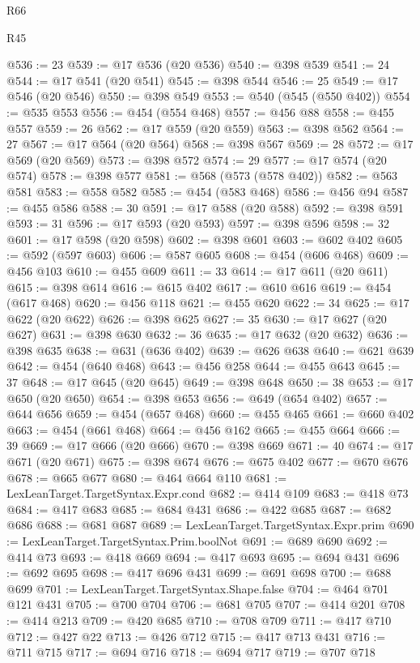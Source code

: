 \begin{lexlean}{R66}
\begin{lexlean}{R45}
\begin{coremodule}
{{{{{{{{{{{{{{{{{{{{{{{{{{{{{{{{{{{{{{{{{{{{{{{{{{{{{{{{{{{{{{{{{{{{{{{{{{{{{{{{{{{{{{{{{{{@536 := 23
@539 := @17 @536 (@20 @536)
@540 := @398 @539
@541 := 24
@544 := @17 @541 (@20 @541)
@545 := @398 @544
@546 := 25
@549 := @17 @546 (@20 @546)
@550 := @398 @549
@553 := @540 (@545 (@550 @402))
@554 := @535 @553
@556 := @454 (@554 @468)
@557 := @456 @88
@558 := @455 @557
@559 := 26
@562 := @17 @559 (@20 @559)
@563 := @398 @562
@564 := 27
@567 := @17 @564 (@20 @564)
@568 := @398 @567
@569 := 28
@572 := @17 @569 (@20 @569)
@573 := @398 @572
@574 := 29
@577 := @17 @574 (@20 @574)
@578 := @398 @577
@581 := @568 (@573 (@578 @402))
@582 := @563 @581
@583 := @558 @582
@585 := @454 (@583 @468)
@586 := @456 @94
@587 := @455 @586
@588 := 30
@591 := @17 @588 (@20 @588)
@592 := @398 @591
@593 := 31
@596 := @17 @593 (@20 @593)
@597 := @398 @596
@598 := 32
@601 := @17 @598 (@20 @598)
@602 := @398 @601
@603 := @602 @402
@605 := @592 (@597 @603)
@606 := @587 @605
@608 := @454 (@606 @468)
@609 := @456 @103
@610 := @455 @609
@611 := 33
@614 := @17 @611 (@20 @611)
@615 := @398 @614
@616 := @615 @402
@617 := @610 @616
@619 := @454 (@617 @468)
@620 := @456 @118
@621 := @455 @620
@622 := 34
@625 := @17 @622 (@20 @622)
@626 := @398 @625
@627 := 35
@630 := @17 @627 (@20 @627)
@631 := @398 @630
@632 := 36
@635 := @17 @632 (@20 @632)
@636 := @398 @635
@638 := @631 (@636 @402)
@639 := @626 @638
@640 := @621 @639
@642 := @454 (@640 @468)
@643 := @456 @258
@644 := @455 @643
@645 := 37
@648 := @17 @645 (@20 @645)
@649 := @398 @648
@650 := 38
@653 := @17 @650 (@20 @650)
@654 := @398 @653
@656 := @649 (@654 @402)
@657 := @644 @656
@659 := @454 (@657 @468)
@660 := @455 @465
@661 := @660 @402
@663 := @454 (@661 @468)
@664 := @456 @162
@665 := @455 @664
@666 := 39
@669 := @17 @666 (@20 @666)
@670 := @398 @669
@671 := 40
@674 := @17 @671 (@20 @671)
@675 := @398 @674
@676 := @675 @402
@677 := @670 @676
@678 := @665 @677
@680 := @464 @664 @110
@681 := LexLeanTarget.TargetSyntax.Expr.cond
@682 := @414 @109
@683 := @418 @73
@684 := @417 @683
@685 := @684 @431
@686 := @422 @685
@687 := @682 @686
@688 := @681 @687
@689 := LexLeanTarget.TargetSyntax.Expr.prim
@690 := LexLeanTarget.TargetSyntax.Prim.boolNot
@691 := @689 @690
@692 := @414 @73
@693 := @418 @669
@694 := @417 @693
@695 := @694 @431
@696 := @692 @695
@698 := @417 @696 @431
@699 := @691 @698
@700 := @688 @699
@701 := LexLeanTarget.TargetSyntax.Shape.false
@704 := @464 @701 @121 @431
@705 := @700 @704
@706 := @681 @705
@707 := @414 @201
@708 := @414 @213
@709 := @420 @685
@710 := @708 @709
@711 := @417 @710
@712 := @427 @22
@713 := @426 @712
@715 := @417 @713 @431
@716 := @711 @715
@717 := @694 @716
@718 := @694 @717
@719 := @707 @718
}}}}}}}}}}}}}}}}}}}}}}}}}}}}}}}}}}}}}}}}}}}}}}}}}}}}}}}}}}}}}}}}}}}}}}}}}}}}}}}}}}}}}}}}}}}
\end{coremodule}
\end{lexlean}
\end{lexlean}
